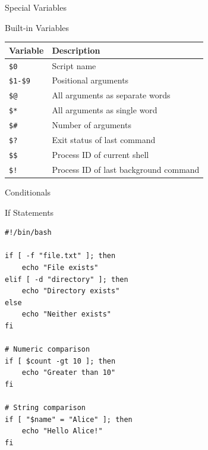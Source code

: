 \documentclass[presentation,aspectratio=1610]{beamer}
\begin{document}
\begin{frame}[label={sec:orgdac189b},fragile]{Special Variables}
 \begin{block}{Built-in Variables}
\begin{center}
\begin{tabular}{ll}
Variable & Description\\
\hline
\texttt{\$0} & Script name\\
\texttt{\$1-\$9} & Positional arguments\\
\texttt{\$@} & All arguments as separate words\\
\texttt{\$*} & All arguments as single word\\
\texttt{\$\#} & Number of arguments\\
\texttt{\$?} & Exit status of last command\\
\texttt{\$\$} & Process ID of current shell\\
\texttt{\$!} & Process ID of last background command\\
\end{tabular}
\end{center}
\end{block}
\end{frame}
\begin{frame}[label={sec:org7880247},fragile]{Conditionals}
 \begin{block}{If Statements}
\begin{verbatim}
#!/bin/bash

if [ -f "file.txt" ]; then
    echo "File exists"
elif [ -d "directory" ]; then
    echo "Directory exists"
else
    echo "Neither exists"
fi

# Numeric comparison
if [ $count -gt 10 ]; then
    echo "Greater than 10"
fi

# String comparison
if [ "$name" = "Alice" ]; then
    echo "Hello Alice!"
fi
\end{verbatim}
\end{block}
\end{frame}
\end{document}
